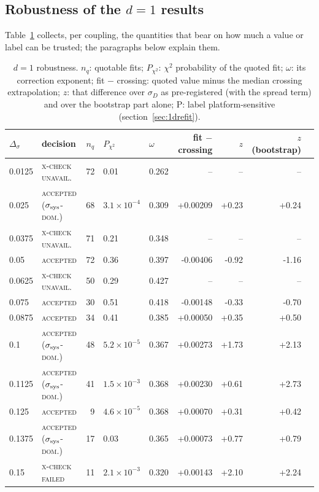 \documentclass[10pt,a4paper]{article}
\newcommand{\Ds}{\Delta_\sigma}
\newcommand{\lbl}[1]{{\mdseries\scshape #1}}
\begin{document}
\subsection{\texorpdfstring{Robustness of the $d=1$ results}{Robustness of the d=1 results}}\label{sec:robust}
Table~\ref{tab:robust} collects, per coupling, the quantities that bear on how much a value or label can be trusted; the paragraphs below
explain them.
\begin{table}[htbp]\centering\scriptsize
\caption{$d=1$ robustness. $n_q$: quotable fits; $P_{\chi^2}$: $\chi^2$ probability of the quoted fit; $\omega$: its correction exponent; fit $-$
crossing: quoted value minus the median crossing extrapolation; $z$: that difference over $\sigma_D$ as pre-registered (with the spread
term) and over the bootstrap part alone; P: label platform-sensitive (section~\ref{sec:1drefit}).}\label{tab:robust}
\begin{tabular}{@{}llrllrrrl@{}}\toprule
$\Ds$ & decision & $n_q$ & $P_{\chi^2}$ & $\omega$ & fit $-$ crossing & $z$ & $z$ (bootstrap) & \\\midrule
0.0125 & \lbl{x-check unavail.} & 72 & 0.01 & 0.262 & -- & -- & -- &  \\
0.025 & \lbl{accepted ($\sigma_{\rm sys}$-dom.)} & 68 & $3.1\times10^{-4}$ & 0.309 & +0.00209 & +0.23 & +0.24 &  \\
0.0375 & \lbl{x-check unavail.} & 71 & 0.21 & 0.348 & -- & -- & -- &  \\
0.05 & \lbl{accepted} & 72 & 0.36 & 0.397 & -0.00406 & -0.92 & -1.16 &  \\
0.0625 & \lbl{x-check unavail.} & 50 & 0.29 & 0.427 & -- & -- & -- &  \\
0.075 & \lbl{accepted} & 30 & 0.51 & 0.418 & -0.00148 & -0.33 & -0.70 &  \\
0.0875 & \lbl{accepted} & 34 & 0.41 & 0.385 & +0.00050 & +0.35 & +0.50 &  \\
0.1 & \lbl{accepted ($\sigma_{\rm sys}$-dom.)} & 48 & $5.2\times10^{-5}$ & 0.367 & +0.00273 & +1.73 & +2.13 &  \\
0.1125 & \lbl{accepted ($\sigma_{\rm sys}$-dom.)} & 41 & $1.5\times10^{-3}$ & 0.368 & +0.00230 & +0.61 & +2.73 &  \\
0.125 & \lbl{accepted} & 9 & $4.6\times10^{-5}$ & 0.368 & +0.00070 & +0.31 & +0.42 &  \\
0.1375 & \lbl{accepted ($\sigma_{\rm sys}$-dom.)} & 17 & 0.03 & 0.365 & +0.00073 & +0.77 & +0.79 &  \\
0.15 & \lbl{x-check failed} & 11 & $2.1\times10^{-3}$ & 0.320 & +0.00143 & +2.10 & +2.24 &  \\

\end{tabular}
\end{table}
\end{document}
